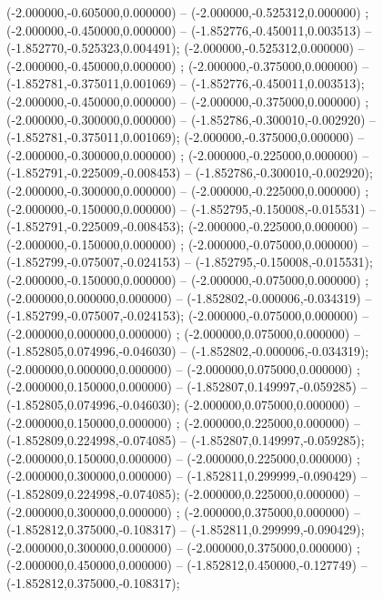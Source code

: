 (-2.000000,-0.605000,0.000000) -- (-2.000000,-0.525312,0.000000) ;
 (-2.000000,-0.450000,0.000000) -- (-1.852776,-0.450011,0.003513) -- (-1.852770,-0.525323,0.004491);
 (-2.000000,-0.525312,0.000000) -- (-2.000000,-0.450000,0.000000) ;
 (-2.000000,-0.375000,0.000000) -- (-1.852781,-0.375011,0.001069) -- (-1.852776,-0.450011,0.003513);
 (-2.000000,-0.450000,0.000000) -- (-2.000000,-0.375000,0.000000) ;
 (-2.000000,-0.300000,0.000000) -- (-1.852786,-0.300010,-0.002920) -- (-1.852781,-0.375011,0.001069);
 (-2.000000,-0.375000,0.000000) -- (-2.000000,-0.300000,0.000000) ;
 (-2.000000,-0.225000,0.000000) -- (-1.852791,-0.225009,-0.008453) -- (-1.852786,-0.300010,-0.002920);
 (-2.000000,-0.300000,0.000000) -- (-2.000000,-0.225000,0.000000) ;
 (-2.000000,-0.150000,0.000000) -- (-1.852795,-0.150008,-0.015531) -- (-1.852791,-0.225009,-0.008453);
 (-2.000000,-0.225000,0.000000) -- (-2.000000,-0.150000,0.000000) ;
 (-2.000000,-0.075000,0.000000) -- (-1.852799,-0.075007,-0.024153) -- (-1.852795,-0.150008,-0.015531);
 (-2.000000,-0.150000,0.000000) -- (-2.000000,-0.075000,0.000000) ;
 (-2.000000,0.000000,0.000000) -- (-1.852802,-0.000006,-0.034319) -- (-1.852799,-0.075007,-0.024153);
 (-2.000000,-0.075000,0.000000) -- (-2.000000,0.000000,0.000000) ;
 (-2.000000,0.075000,0.000000) -- (-1.852805,0.074996,-0.046030) -- (-1.852802,-0.000006,-0.034319);
 (-2.000000,0.000000,0.000000) -- (-2.000000,0.075000,0.000000) ;
 (-2.000000,0.150000,0.000000) -- (-1.852807,0.149997,-0.059285) -- (-1.852805,0.074996,-0.046030);
 (-2.000000,0.075000,0.000000) -- (-2.000000,0.150000,0.000000) ;
 (-2.000000,0.225000,0.000000) -- (-1.852809,0.224998,-0.074085) -- (-1.852807,0.149997,-0.059285);
 (-2.000000,0.150000,0.000000) -- (-2.000000,0.225000,0.000000) ;
 (-2.000000,0.300000,0.000000) -- (-1.852811,0.299999,-0.090429) -- (-1.852809,0.224998,-0.074085);
 (-2.000000,0.225000,0.000000) -- (-2.000000,0.300000,0.000000) ;
 (-2.000000,0.375000,0.000000) -- (-1.852812,0.375000,-0.108317) -- (-1.852811,0.299999,-0.090429);
 (-2.000000,0.300000,0.000000) -- (-2.000000,0.375000,0.000000) ;
 (-2.000000,0.450000,0.000000) -- (-1.852812,0.450000,-0.127749) -- (-1.852812,0.375000,-0.108317);
